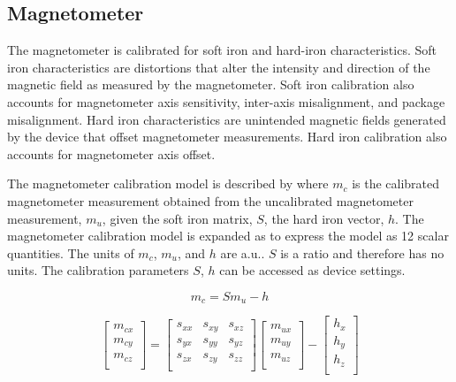 \subsection{Magnetometer}
\label{sec:magnetometer}

The magnetometer is calibrated for soft iron and hard-iron characteristics.  Soft iron characteristics are distortions that alter the intensity and direction of the magnetic field as measured by the magnetometer.  Soft iron calibration also accounts for magnetometer axis sensitivity, inter-axis misalignment, and package misalignment.  Hard iron characteristics are unintended magnetic fields generated by the device that offset magnetometer measurements.  Hard iron calibration also accounts for magnetometer axis offset.

The magnetometer calibration model is described by  where $m_c$ is the calibrated magnetometer measurement obtained from the uncalibrated magnetometer measurement, $m_u$, given the soft iron matrix, $S$, the hard iron vector, $h$.  The magnetometer calibration model is expanded as  to express the model as 12 scalar quantities.  The units of $m_c$, $m_u$, and $h$ are \ac{a.u.}.  $S$ is a ratio and therefore has no units.  The calibration parameters $S$, $h$ can be accessed as device settings.

\begin{equation}
\label{eq:magnetometer}
m_c = S m_u - h
\end{equation}

\begin{equation}
\label{eq:magnetometerExpanded}
    \begin{bmatrix}
        m_{cx}\\
        m_{cy}\\
        m_{cz}\\
    \end{bmatrix}
    =
    \begin{bmatrix}
        s_{xx} & s_{xy} & s_{xz}\\
        s_{yx} & s_{yy} & s_{yz}\\
        s_{zx} & s_{zy} & s_{zz}\\
    \end{bmatrix}
    \begin{bmatrix}
        m_{ux}\\
        m_{uy}\\
        m_{uz}\\
    \end{bmatrix}
    -
    \begin{bmatrix}
        h_{x}\\
        h_{y}\\
        h_{z}\\
    \end{bmatrix}
\end{equation}

